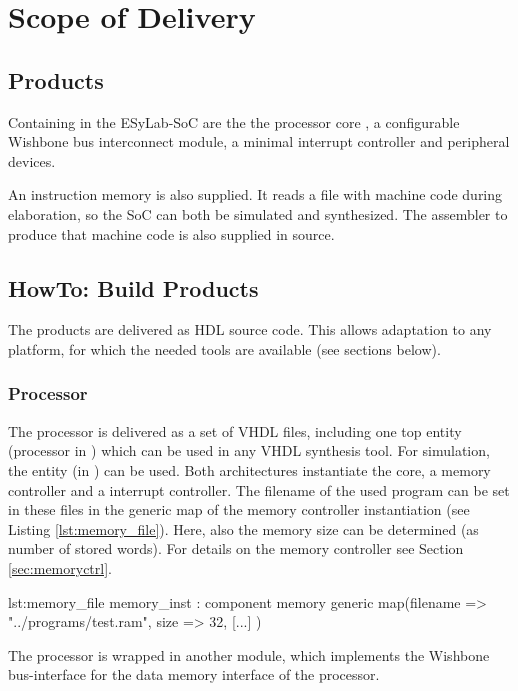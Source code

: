 \chapter{Scope of Delivery}
\section{Products}
Containing in the ESyLab-SoC are the the processor core \procname, 
a configurable Wishbone bus interconnect module, 
a minimal interrupt controller and peripheral devices.

An instruction memory is also supplied.
It reads a file with machine code during elaboration, 
so the SoC can both be simulated and synthesized.
The assembler to produce that machine code is also supplied in source.

\section{HowTo: Build Products}
\label{sec:scope_build}
The products are delivered as HDL source code. 
This allows adaptation to any platform, for which the needed tools are available (see sections below).

\subsection{Processor}
The processor is delivered as a set of VHDL files, including one top entity (processor in ) which can be used in any VHDL synthesis tool.
For simulation, the entity  (in ) can be used. Both architectures instantiate the core, a memory controller and a interrupt controller.
The filename of the used program can be set in these files in the generic map of the memory controller instantiation (see Listing \ref{lst:memory_file}).
Here, also the memory size can be determined (as number of stored words). For details on the memory controller see Section \ref{sec:memoryctrl}.

\begin{vhdl}{lst:memory_file}
memory_inst : component memory
	generic map(filename     => "../programs/test.ram",
		        size         => 32,
		        [...]
		        )
\end{vhdl}

The processor is wrapped in another module,
which implements the Wishbone bus-interface for the data memory interface of the processor.

